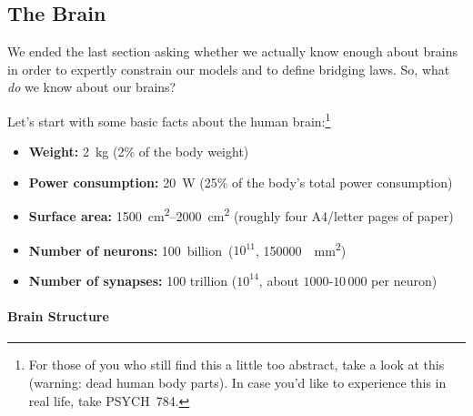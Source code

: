 \documentclass[10pt,letterpaper,oneside]{article}
\begin{document}


\subsection{The Brain}

We ended the last section asking whether we actually know enough about brains in order to expertly constrain our models and to define bridging laws. So, what \emph{do} we know about our brains?

Let's start with some basic facts about the human brain:\footnote{For those of you who still find this a little too abstract, take a look at this  (warning: dead human body parts). In case you'd like to experience this in real life, take PSYCH~784.}
\begin{itemize}
	\item \textbf{Weight:} \SI{2}{\kilogram} (2\% of the body weight)
	\item \textbf{Power consumption:} \SI{20}{\watt} (25\% of the body's total power consumption)
	\item \textbf{Surface area:} \SIrange{1500}{2000}{\centi\metre\squared} (roughly four A4/letter pages of paper)
	\item \textbf{Number of neurons:} \SI{100} billion ($10^{11}$, \SI{150000}{\per\milli\metre\squared})
	\item \textbf{Number of synapses:} 100 trillion ($10^{14}$, about $1000$-$10\,000$ per neuron)
\end{itemize}


\paragraph{Brain Structure}
\end{document}
